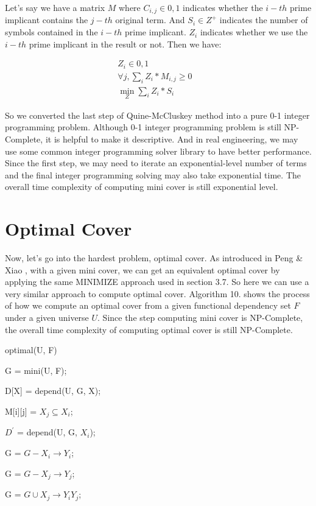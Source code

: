 \documentclass[11pt]{book}
\begin{document}
Let's say we have a matrix $M$ where $C_{i, j} \in {0, 1}$ indicates whether the $i-th$ prime implicant contains the $j-th$ original term. And $S_{i} \in Z^{+}$ indicates the number of symbols contained in the $i-th$ prime implicant. $Z_i$ indicates whether we use the $i-th$ prime implicant in the result or not. Then we have:

\begin{align}
	Z_i \in {0, 1} & \\
	\forall j, \sum_{i} Z_i * M_{i, j} \geq 0 \\
	\min_{Z} \sum_{i} Z_i * S_{i}		 
\end{align}

So we converted the last step of Quine-McCluskey method into a pure 0-1 integer programming problem. Although 0-1 integer programming problem is still NP-Complete, it is helpful to make it descriptive. And in real engineering, we may use some common integer programming solver library to have better performance. Since the first step, we may need to iterate an exponential-level number of terms and the final integer programming solving may also take exponential time. The overall time complexity of computing mini cover is still exponential level.

\section{Optimal Cover}

Now, let's go into the hardest problem, optimal cover. As introduced in Peng \& Xiao \cite{peng2016optimal}, with a given mini cover, we can get an equivalent optimal cover by applying the same MINIMIZE approach used in section 3.7. So here we can use a very similar approach to compute optimal cover. Algorithm 10. shows the process of how we compute an optimal cover from a given functional dependency set $F$ under a given universe $U$. Since the step computing mini cover is NP-Complete,
the overall time complexity of computing optimal cover is still NP-Complete.

\begin{algorithm}
  \caption{optimal(U, F)}
  
  \SetAlgoLined
  
  G = mini(U, F);
  
   {
  	D[X] = depend(U, G, X);
  }
  
   {
  	 {
  	  M[i][j] = $X_j \subseteq X_i$;  	
  	}
  }
  
   {
    $D^{'}$ = depend(U, G, $X_i$);
    
     {
       {
      	G = $G - {X_i \rightarrow Y_i}$;
      	
      	G = $G - {X_j \rightarrow Y_j}$;

      	G = $G \cup {X_j \rightarrow Y_iY_j}$;
      }
    }    
  }
\end{algorithm}
\end{document}
